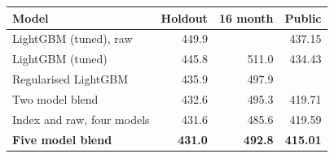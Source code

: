 \begin{tabular}{lrrr}
\hline
\textbf{Model} & \textbf{Holdout} & \textbf{16 month} & \textbf{Public} \\
\hline
LightGBM (tuned), raw & 449.9 & & 437.15 \\
LightGBM (tuned) & 445.8 & 511.0 & 434.43 \\
Regularised LightGBM & 435.9 & 497.9 &  \\
Two model blend & 432.6 & 495.3 & 419.71 \\
Index and raw, four models & 431.6 & 485.6 & 419.59 \\
\textbf{Five model blend} & \textbf{431.0} & \textbf{492.8} & \textbf{415.01} \\
\hline
\end{tabular}
